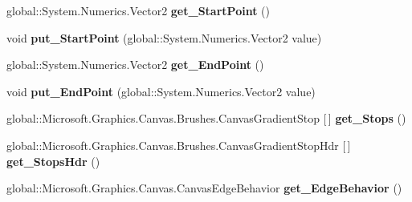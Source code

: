 \begin{DoxyCompactItemize}
global\+::\+System.\+Numerics.\+Vector2 {\bfseries get\+\_\+\+Start\+Point} ()
\item 
\mbox{\label{interface_microsoft_1_1_graphics_1_1_canvas_1_1_brushes_1_1_i_canvas_linear_gradient_brush_a4fde9ab6feb18000a3354b8af87b6090}} 
void {\bfseries put\+\_\+\+Start\+Point} (global\+::\+System.\+Numerics.\+Vector2 value)
\item 
\mbox{\label{interface_microsoft_1_1_graphics_1_1_canvas_1_1_brushes_1_1_i_canvas_linear_gradient_brush_a2b2ca3d763cdba157da6194c916b2f23}} 
global\+::\+System.\+Numerics.\+Vector2 {\bfseries get\+\_\+\+End\+Point} ()
\item 
\mbox{\label{interface_microsoft_1_1_graphics_1_1_canvas_1_1_brushes_1_1_i_canvas_linear_gradient_brush_a30abb12d8a483fb83548dc05572ce0df}} 
void {\bfseries put\+\_\+\+End\+Point} (global\+::\+System.\+Numerics.\+Vector2 value)
\item 
\mbox{\label{interface_microsoft_1_1_graphics_1_1_canvas_1_1_brushes_1_1_i_canvas_linear_gradient_brush_a55f67f2e43ac0e0d8497e485ea121aef}} 
global\+::\+Microsoft.\+Graphics.\+Canvas.\+Brushes.\+Canvas\+Gradient\+Stop \mbox{[}$\,$\mbox{]} {\bfseries get\+\_\+\+Stops} ()
\item 
\mbox{\label{interface_microsoft_1_1_graphics_1_1_canvas_1_1_brushes_1_1_i_canvas_linear_gradient_brush_a245855b464b23967c3b7710dcb9295a1}} 
global\+::\+Microsoft.\+Graphics.\+Canvas.\+Brushes.\+Canvas\+Gradient\+Stop\+Hdr \mbox{[}$\,$\mbox{]} {\bfseries get\+\_\+\+Stops\+Hdr} ()
\item 
\mbox{\label{interface_microsoft_1_1_graphics_1_1_canvas_1_1_brushes_1_1_i_canvas_linear_gradient_brush_a9f8af02ad0512ad6ea1051030ea8d8b5}} 
global\+::\+Microsoft.\+Graphics.\+Canvas.\+Canvas\+Edge\+Behavior {\bfseries get\+\_\+\+Edge\+Behavior} ()

\end{DoxyCompactItemize}
